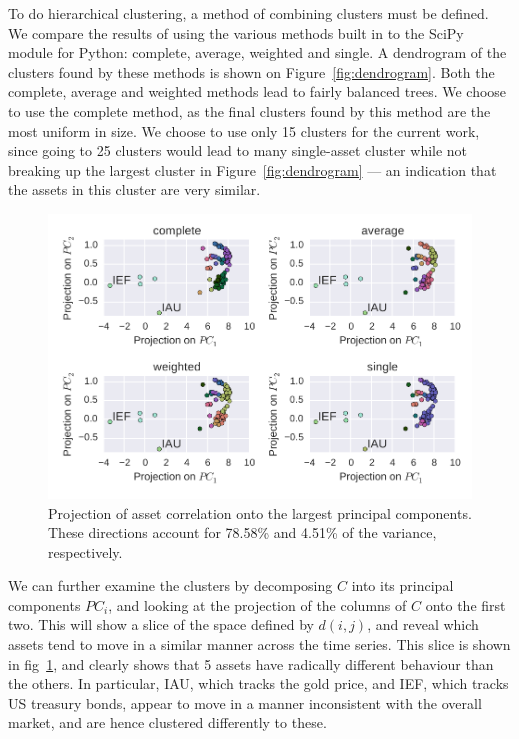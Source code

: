 To do hierarchical clustering, a method of combining clusters must be defined.
We compare the results of using the various methods built in to the SciPy module for Python: complete, average, weighted and single.
A dendrogram of the clusters found by these methods is shown on Figure~\ref{fig:dendrogram}.
Both the complete, average and weighted methods lead to fairly balanced trees.
We choose to use the complete method, as the final clusters found by this method are the most uniform in size.
We choose to use only 15 clusters for the current work, since going to 25 clusters would lead to many single-asset cluster while not breaking up the largest cluster in Figure~\ref{fig:dendrogram} --- an indication that the assets in this cluster are very similar.

\begin{figure}[tp]
\centering
\includegraphics{../pic/pca_methods.pdf}
\caption{Projection of asset correlation onto the largest principal components. These directions account for 78.58\% and 4.51\% of the variance, respectively.}
\label{fig:pca}
\end{figure}

We can further examine the clusters by decomposing $C$ into its principal components $PC_i$, and looking at the projection of the columns of $C$ onto the first two.
This will show a slice of the space defined by $d(i,j)$, and reveal which assets tend to move in a similar manner across the time series.
This slice is shown in fig~\ref{fig:pca}, and clearly shows that 5 assets have radically different behaviour than the others.
In particular, IAU, which tracks the gold price, and IEF, which tracks US treasury bonds, appear to move in a manner inconsistent with the overall market, and are hence clustered differently to these.

